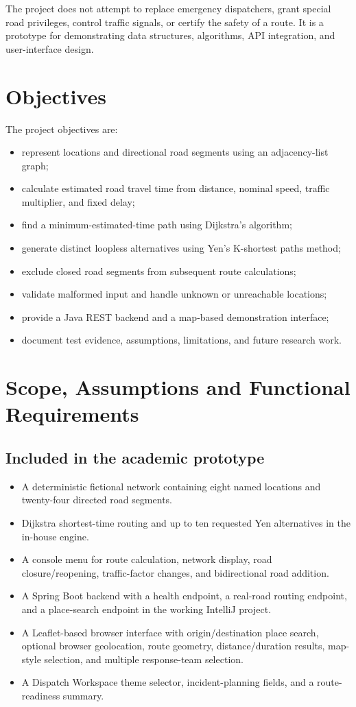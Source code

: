 \documentclass[11pt,a4paper]{article}
\begin{document}
The project does not attempt to replace emergency dispatchers, grant special road privileges, control traffic signals, or certify the safety of a route. It is a prototype for demonstrating data structures, algorithms, API integration, and user-interface design.

\section{Objectives}
The project objectives are:
\begin{itemize}
  \item represent locations and directional road segments using an adjacency-list graph;
  \item calculate estimated road travel time from distance, nominal speed, traffic multiplier, and fixed delay;
  \item find a minimum-estimated-time path using Dijkstra's algorithm;
  \item generate distinct loopless alternatives using Yen's K-shortest paths method;
  \item exclude closed road segments from subsequent route calculations;
  \item validate malformed input and handle unknown or unreachable locations;
  \item provide a Java REST backend and a map-based demonstration interface;
  \item document test evidence, assumptions, limitations, and future research work.
\end{itemize}

\section{Scope, Assumptions and Functional Requirements}
\subsection{Included in the academic prototype}
\begin{itemize}
  \item A deterministic fictional network containing eight named locations and twenty-four directed road segments.
  \item Dijkstra shortest-time routing and up to ten requested Yen alternatives in the in-house engine.
  \item A console menu for route calculation, network display, road closure/reopening, traffic-factor changes, and bidirectional road addition.
  \item A Spring Boot backend with a health endpoint, a real-road routing endpoint, and a place-search endpoint in the working IntelliJ project.
  \item A Leaflet-based browser interface with origin/destination place search, optional browser geolocation, route geometry, distance/duration results, map-style selection, and multiple response-team selection.
  \item A Dispatch Workspace theme selector, incident-planning fields, and a route-readiness summary.
\end{itemize}
\end{document}
